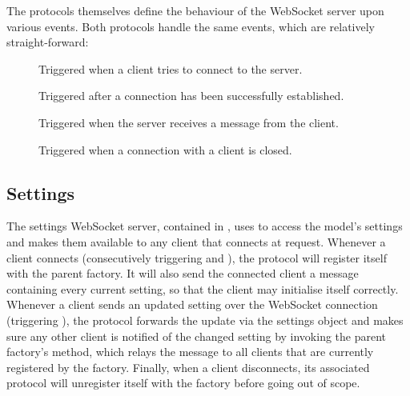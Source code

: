 \documentclass[a4paper, openany, oneside]{memoir}
\begin{document}
The protocols themselves define the behaviour of the WebSocket server upon various events. Both protocols handle the same events, which are relatively straight-forward:
\begin{description}
	\item[] Triggered when a client tries to connect to the server.
	\item[] Triggered after a connection has been successfully established.
	\item[] Triggered when the server receives a message from the client.
	\item[] Triggered when a connection with a client is closed.
\end{description}

\subsection{Settings}
\label{sub:websocket_settings}
The settings WebSocket server, contained in , uses  to access the model's settings and makes them available to any client that connects at request.
Whenever a client connects (consecutively triggering  and ), the protocol will register itself with the parent factory. It will also send the connected client a message containing every current setting, so that the client may initialise itself correctly. Whenever a client sends an updated setting over the WebSocket connection (triggering ), the protocol forwards the update via the  settings object and makes sure any other client is notified of the changed setting by invoking the parent factory's  method, which relays the message to all clients that are currently registered by the factory. Finally, when a client disconnects, its associated protocol will unregister itself with the factory before going out of scope.
\end{document}
